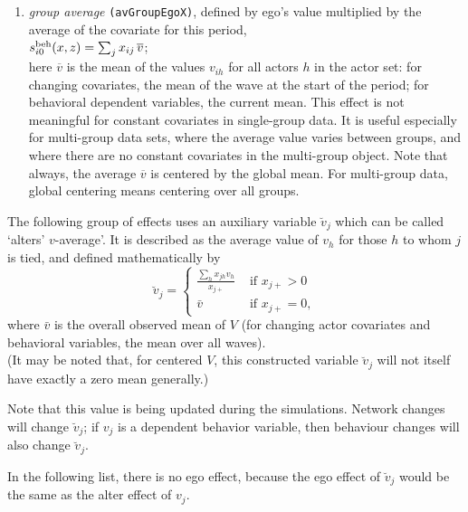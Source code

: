 \documentclass[a4paper,fleqn,11pt]{article}
\newcommand{\+}{\, + \,}
\newcommand{\vit}{\theenumi}
\newcounter{savenumi}
\begin{document}
\begin{enumerate}
\setcounter{savenumi}{\value{enumi}}

 \item {\em group average} \texttt{(avGroupEgoX)}, defined by ego's value multiplied by the
 average of the covariate for this period,  \\
 $s^{\rm beh}_{i\vit}(x, z) =  \sum_j x_{ij} \, \overline {v}  $;\\
 here $\overline {v}$ is the mean of the values $v_{ih}$ for all actors $h$
 in the actor set: for changing covariates, the mean of the wave at the
 start of the period; for behavioral dependent variables,
 the current mean.
 This effect is not meaningful for constant covariates in single-group data.
 It is useful especially for multi-group data sets, where the average value
 varies between groups, and where there are no constant covariates
 in the multi-group object.
 Note that always, the average $\overline {v} $ is centered by the global mean.
 For multi-group data, global centering means centering over all groups.
\end{enumerate}

\noindent
The following group of effects uses an auxiliary variable $\breve v_j$ which
can be called `alters' $v$-average'.
It is described as the average value of $v_h$ for those $h$
to whom $j$ is tied, and defined mathematically by
\begin{equation}
  \breve v_j = \left\{\begin{array}{ll} \displaystyle
         \frac{\sum_h x_{jh}v_h}{x_{j+}}  &  \text{ if } x_{j+} > 0     \\
         \bar v                                &  \text{ if } x_{j+} = 0  ,
  \end{array}   \right.            \label{alt_av}
\end{equation}
where $\bar v$ is the overall observed mean of $V$ (for changing
actor covariates and behavioral variables, the mean over all waves).\\
(It may be noted that, for centered $V$, this constructed variable $\breve v_j$
will not itself have exactly a zero mean generally.)

Note that this value is being updated during the simulations.
Network changes will change $\breve v_j$; if $v_j$ is a dependent behavior
variable, then behaviour changes will also change $\breve v_j$.

In the following list, there is no ego effect, because the ego effect
of $\breve v_j$ would be the same as the alter effect of $v_j$.
\end{document}

